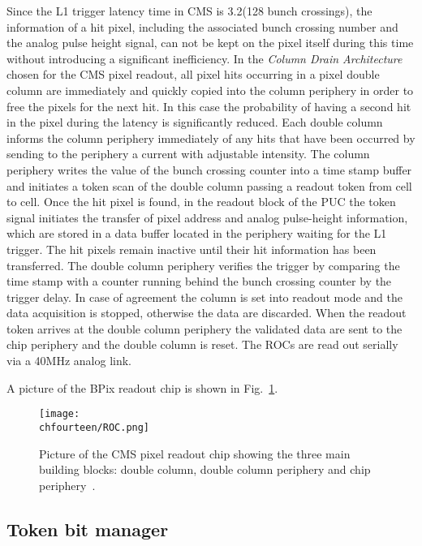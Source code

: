 Since the L1 trigger latency time in CMS is 3.2\mus (128 bunch crossings), the information of a hit pixel, including the associated bunch crossing number and the analog pulse height signal, can not be kept on the pixel itself during this time without introducing a significant inefficiency. In the {\itshape Column Drain Architecture} chosen for the CMS pixel readout, all pixel hits occurring in a pixel double column are immediately and quickly copied into the column periphery in order to free the pixels for the next hit. In this case the probability of having a second hit in the pixel during the latency is significantly reduced.
Each double column informs the column periphery immediately of any hits that have been occurred by sending to the periphery a current with adjustable intensity.
The column periphery writes the value of the bunch crossing counter into a time stamp buffer and initiates a token scan of the double column passing a readout token from cell to cell.
Once the hit pixel is found, in the readout block of the PUC the token signal initiates the transfer of pixel address and analog pulse-height information, which are stored in a data buffer located in the periphery waiting for the L1 trigger. The hit pixels remain inactive until their hit information has been transferred.
The double column periphery verifies the trigger by comparing the time stamp with a counter running behind the bunch crossing counter by the trigger delay. In case of agreement the column is set into readout mode and the data acquisition is stopped, otherwise the data are discarded. When the readout token arrives at the double column periphery the validated data are sent to the chip periphery and the double column is reset. The ROCs are read out serially via a 40\unit{MHz} analog link.

A picture of the BPix readout chip is shown in Fig.~\ref{fig:ROC}.

\begin{figure}[!htb]
 \begin{center}
 \texttt{[image: \\chfourteen/ROC.png]}
 \end{center}
 \caption{Picture of the CMS pixel readout chip showing the three main building blocks: double column, double column periphery and chip periphery~\cite{Chatrchyan:2008zzk}.}
 \label{fig:ROC}
\end{figure}

\subsection{Token bit manager}\label{subsec:BPix_TBM}

